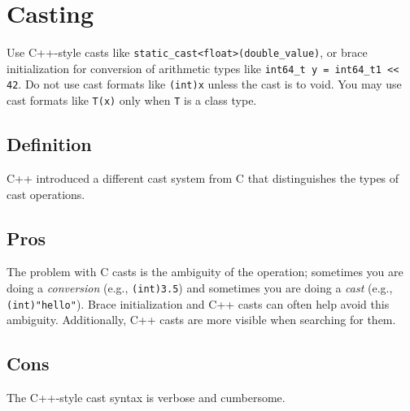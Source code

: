 
\section{Casting}\label{sec:casting}
Use C++-style casts like \texttt{static_cast<float>(double_value)}, or brace initialization for conversion of arithmetic types like \texttt{int64_t y = int64_t{1} << 42}. Do not use cast formats like \texttt{(int)x} unless the cast is to void. You may use cast formats like \texttt{T(x)} only when \texttt{T} is a class type.

\subsection{Definition}
C++ introduced a different cast system from C that distinguishes the types of cast operations.

\subsection{Pros}
The problem with C casts is the ambiguity of the operation; sometimes you are doing a \emph{conversion} (e.g., \texttt{(int)3.5}) and sometimes you are doing a \emph{cast} (e.g., \texttt{(int)"hello"}). Brace initialization and C++ casts can often help avoid this ambiguity. Additionally, C++ casts are more visible when searching for them.

\subsection{Cons}
The C++-style cast syntax is verbose and cumbersome.

